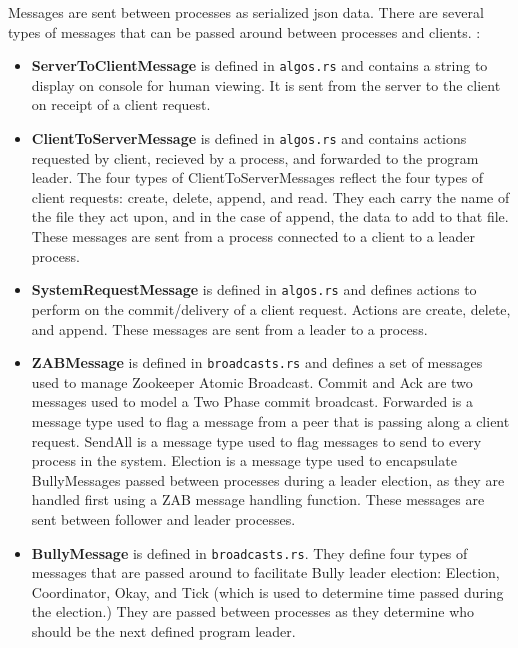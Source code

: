 \documentclass{article}
\begin{document}
    Messages are sent between processes as serialized json data. There are several types of messages that can be passed around between processes and clients. :
\begin{itemize}
        \item\textbf{ServerToClientMessage} is defined in \verb|algos.rs| and contains a string to display on console for human viewing. It is sent from the server to the client on receipt of a client request.
        \item\textbf{ClientToServerMessage} is defined in \verb|algos.rs| and contains actions requested by client, recieved by a process, and forwarded to the program leader. The four types of ClientToServerMessages reflect the four types of client requests: create, delete, append, and read. They each carry the name of the file they act upon, and in the case of append, the data to add to that file. These messages are sent from a process connected to a client to a leader process.
        \item\textbf{SystemRequestMessage} is defined in \verb|algos.rs| and defines actions to perform on the commit/delivery of a client request. Actions are create, delete, and append. These messages are sent from a leader to a process.
        \item\textbf{ZABMessage} is defined in \verb|broadcasts.rs| and defines a set of messages used to manage Zookeeper Atomic Broadcast. Commit and Ack are two messages used to model a Two Phase commit broadcast. Forwarded is a message type used to flag a message from a peer that is passing along a client request. SendAll is a message type used to flag messages to send to every process in the system. Election is a message type used to encapsulate BullyMessages passed between processes during a leader election, as they are handled first using a ZAB message handling function. These messages are sent between follower and leader processes.
        \item\textbf{BullyMessage} is defined in \verb|broadcasts.rs|. They define four types of messages that are passed around to facilitate Bully leader election: Election, Coordinator, Okay, and Tick (which is used to determine time passed during the election.) They are passed between processes as they determine who should be the next defined program leader.
\end{itemize}
\end{document}
